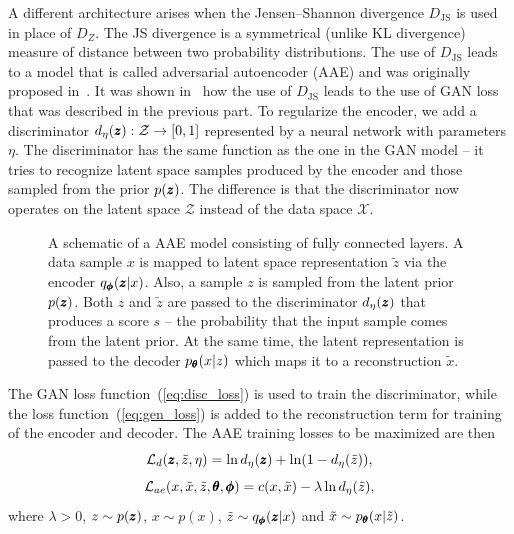 A different architecture arises when the Jensen--Shannon divergence
$D_{\text{JS}}$ is used in place of $D_{Z}$. The JS divergence is
a symmetrical (unlike KL divergence) measure of distance between two
probability distributions. The use of $D_{\text{JS}}$ leads to a
model that is called adversarial autoencoder (AAE) and was originally
proposed in~\cite{makhzani2015adversarial}. It was shown in~\cite{tolstikhin2017wasserstein}
how the use of $D_{\text{JS}}$ leads to the use of GAN loss that
was described in the previous part. To regularize the encoder, we
add a discriminator $d_{\eta}(\vc{z}):\mathcal{Z}\rightarrow\left[0,1\right]$
represented by a neural network with parameters $\eta$. The discriminator
has the same function as the one in the GAN model -- it tries to
recognize latent space samples produced by the encoder and those sampled
from the prior $p(\pmb{{z}})$. The difference is that the discriminator now
operates on the latent space $\mathcal{Z}$ instead of the data space
$\mathcal{X}$. 

\begin{figure}
\centering{}\caption{A schematic of a AAE model consisting of fully connected layers. A
data sample $x$ is mapped to latent space representation $\tilde{z}$
via the encoder $q_{\pmb{{\phi}}}(\pmb{{z}}|x)$. Also, a sample $z$ is sampled from
the latent prior $p(\pmb{{z}})$. Both $z$ and $\tilde{z}$ are passed to
the discriminator $d_{\eta}(\pmb{{z}})$ that produces a score $s$ -- the
probability that the input sample comes from the latent prior. At
the same time, the latent representation is passed to the decoder
$p_{\pmb{{\theta}}}(x|z)$ which maps it to a reconstruction $\tilde{x}$.}
\label{fig:aae}
\end{figure}

The GAN loss function~(\ref{eq:disc_loss}) is used to train the
discriminator, while the loss function~(\ref{eq:gen_loss}) is added
to the reconstruction term for training of the encoder and decoder.
The AAE training losses to be maximized are then
\begin{equation}
\mathcal{L}_{d}(\pmb{{z}},\tilde{z},\eta)=\ln d_{\eta}(\pmb{{z}})+\ln(1-d_{\eta}(\tilde{z})),\label{eq:aae_loss_disc}
\end{equation}
\begin{equation}
\mathcal{L}_{ae}(x,\tilde{x},\tilde{z},\pmb{{\theta}},\pmb{{\phi}})=c(x,\tilde{x})-\lambda\ln d_{\eta}(\tilde{z}),\label{eq:aae_loss_autoencoder}
\end{equation}
where $\lambda>0$, $z\sim p(\pmb{{z}})$, $x\sim p(x)$, $\tilde{z}\sim q_{\pmb{{\phi}}}(\pmb{{z}}|x)$
and $\tilde{x}\sim p_{\pmb{{\theta}}}(x|\tilde{z})$.

